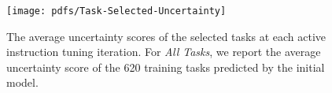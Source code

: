 
\begin{figure}
    \centering
    \texttt{[image: pdfs/Task-Selected-Uncertainty]}
    \vspace{-1.5em}
    \caption{\footnotesize
    The average uncertainty scores of the selected tasks at each active instruction tuning iteration.
    For \textit{All Tasks}, we report the average uncertainty score of the 620 training tasks predicted by the initial model. 
    }
    \vspace{-1em}
    \label{fig:niv2-uncertainty}
\end{figure}
